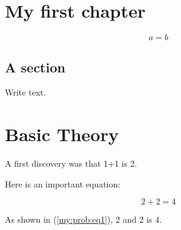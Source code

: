 \documentclass[%
oneside,                 %
final,                   %
chapterprefix=true,      %
open=right,              %
10pt]{book}
\makeatletter
\newenvironment{doconceexercise}{}{}
\newcounter{doconceexercisecounter}%
\newcommand\listofexercises{
\chapter*{List of Exercises
          \@mkboth{List of Exercises}{List of Exercises}}
\markboth{List of Exercises}{List of Exercises}
\@starttoc{loe}
}
\makeatother
\begin{document}
\vspace{1cm} %

\chapter{My first chapter}

\[ a = b \]

\clearpage

\section{A section}

Write text.

\chapter{Basic Theory}
\label{sec:theory}

A first discovery was that 1+1 is 2.

\begin{doconceexercise}

                             

Here is an important equation:

\begin{equation}
2+2 = 4
\label{my:prob:eq1}
\end{equation}

As shown in (\ref{my:prob:eq1}), 2 and 2 is 4.

\end{doconceexercise}



\end{document}
